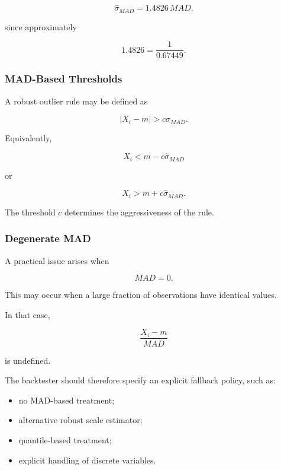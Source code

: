 \documentclass[11pt,a4paper]{article}
\begin{document}
\begin{equation}
\boxed{
\widehat{\sigma}_{MAD}
=
1.4826
\,MAD.
}
\end{equation}

since approximately

\begin{equation}
1.4826
=
\frac{1}{0.67449}.
\end{equation}


\subsubsection{MAD-Based Thresholds}

A robust outlier rule may be defined as

\begin{equation}
\boxed{
|X_i-m|
>
c
\widehat{\sigma}_{MAD}.
}
\end{equation}

Equivalently,

\begin{equation}
X_i
<
m-c\widehat{\sigma}_{MAD}
\end{equation}

or

\begin{equation}
X_i
>
m+c\widehat{\sigma}_{MAD}.
\end{equation}

The threshold $c$ determines the aggressiveness of the rule.


\subsubsection{Degenerate MAD}

A practical issue arises when

\begin{equation}
MAD=0.
\end{equation}

This may occur when a large fraction of observations have identical values.

In that case,

\begin{equation}
\frac{X_i-m}{MAD}
\end{equation}

is undefined.

The backtester should therefore specify an explicit fallback policy, such as:

\begin{itemize}
    \item no MAD-based treatment;
    \item alternative robust scale estimator;
    \item quantile-based treatment;
    \item explicit handling of discrete variables.
\end{itemize}
\end{document}
